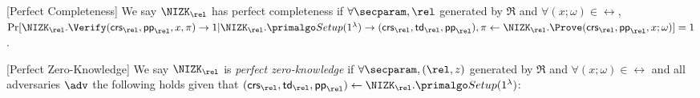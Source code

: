 
\begin{definition}\label{def:nizk_completeness}[Perfect Completeness]
	We say $\NIZK_\rel$ has perfect completeness if $ \forall \secparam, \rel $ generated by $  \mathfrak{R} $ and $ \forall (x;\omega) \in \rel $,  $\Pr[\NIZK_\rel.\Verify(\crs_\rel,  \pp_\rel, x, \pi) \rightarrow 1|\NIZK_\rel.\Setup(1^{\lambda}) \rightarrow (\crs_\rel, \tw_\rel, \pp_\rel), \pi \leftarrow \NIZK_\rel.\Prove(\crs_\rel, \pp_\rel, x; \omega) ] = 1 $.  %
\end{definition}

\def\advV{\ensuremath{V^*}\xspace} %

\begin{definition}\label{def:nizk_zero_knowledge}[Perfect Zero-Knowledge]
	We say $\NIZK_\rel$ is {\em perfect zero-knowledge} if $ \forall \secparam, (\rel,z) $ generated by $  \mathfrak{R} $ and $ \forall (x;\omega) \in \rel $ and all adversaries $ \adv $ the following holds given that  $ (\crs_\rel, \tw_\rel, \pp_\rel) \leftarrow \NIZK_\rel.\Setup (1^{\lambda})$:
	\allowbreak
	
\end{definition}

